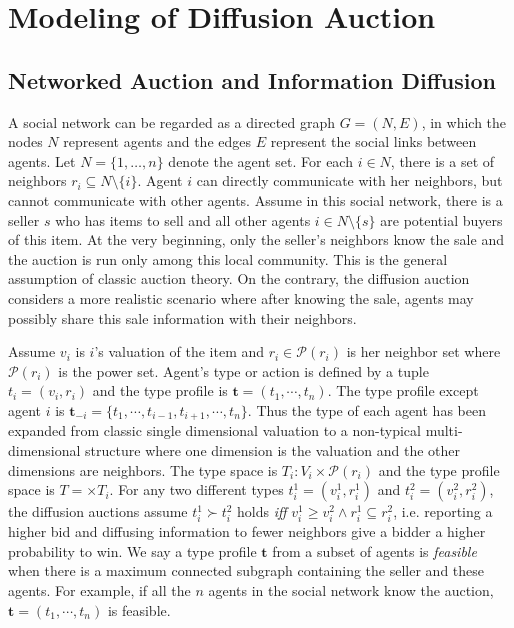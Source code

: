 \documentclass{article}
\newcommand{\defeq}{\overset{\text{\tiny def}}{=}}
\begin{document}
\section{Modeling of Diffusion Auction}
\subsection{Networked Auction and Information Diffusion}
A social network can be regarded as a directed graph $G=(N,E)$, in which the nodes $N$ represent agents and the edges $E$ represent the social links between agents. Let $N=\{1,\dots,n\}$ denote the agent set. For each $i\in N$, there is a set of neighbors $r_i \subseteq N \setminus \{i\}$. Agent $i$ can directly communicate with her neighbors, but cannot communicate with other agents. Assume in this social network, there is a seller $s$ who has items to sell and all other agents $i \in N \setminus \{s\}$ are potential buyers of this item. At the very beginning, only the seller's neighbors know the sale and the auction is run only among this local community. This is the general assumption of classic auction theory. On the contrary, the diffusion auction considers a more realistic scenario where after knowing the sale, agents may possibly share this sale information with their neighbors. 

Assume $v_i$ is $i$'s valuation of the item and $r_i \in {\mathcal P}(r_i)$ is her neighbor set where ${\mathcal P}(r_i)$ is the power set. Agent's type or action is defined by a tuple $t_i=(v_i,r_i)$ and the type profile is ${\mathbf{t}}=(t_1,\cdots,t_n)$. The type profile except agent $i$ is $\mathbf{t}_{-i}=\{t_1,\cdots,t_{i-1},t_{i+1},\cdots,t_n\}$. Thus the type of each agent has been expanded from classic single dimensional valuation to a non-typical multi-dimensional structure where one dimension is the valuation and the other dimensions are neighbors. 
The type space is ${T}_i:V_i\times {\mathcal P}(r_i)$ and the type profile space is $T=\times T_{i}$. 
For any two different types $t_i^1=(v_i^1,r_i^1)$ and $t_i^2=(v_i^2,r_i^2)$, the diffusion auctions assume $t_i^1\succ t_i^2$ holds \textit{iff} $v_i^1\geq v_i^2 \wedge r_i^1\subseteq r_i^2$, i.e. reporting a higher bid and diffusing information to fewer neighbors give a bidder a higher probability to win. We say a type profile $\mathbf{t}$ from a subset of agents is \emph{feasible} when there is a maximum connected subgraph containing the seller and these agents. For example, if all the $n$ agents in the social network know the auction, ${\mathbf{t}}=(t_1,\cdots, t_n)$ is feasible.
\end{document}
